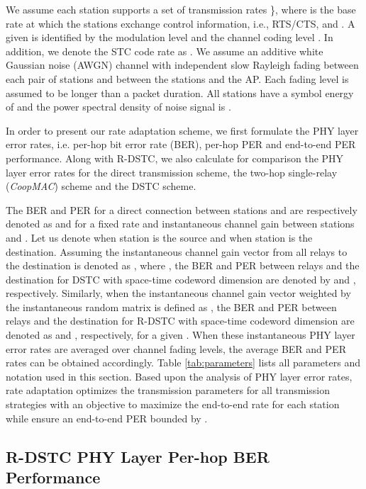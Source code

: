 \documentclass[peerreview,draftcls,onecolumn,12pt,a4paper]{IEEEtran}
\begin{document}
We assume each station supports a set of transmission rates \}, where  is the base rate at which
the stations exchange control information, i.e., RTS/CTS, and
. A given  is identified by the modulation
level  and the channel coding level . In addition, we
denote the STC code rate as . We assume an additive white
Gaussian noise (AWGN) channel with independent slow Rayleigh
fading between each pair of stations and between the stations and
the AP. Each fading level is assumed to be longer than a packet
duration. All stations have a symbol energy of  and the
power spectral density of noise signal is .

In order to present our rate adaptation scheme, we first formulate
the PHY layer error rates, i.e. per-hop bit error rate (BER),
per-hop PER and
end-to-end PER performance. Along with R-DSTC, we also calculate for comparison the PHY layer
error rates for the direct transmission scheme, the two-hop
single-relay ({\em CoopMAC}) scheme and the DSTC scheme.

The BER and PER for a direct connection between stations  and
 are respectively denoted as  and
 for a fixed rate  and instantaneous
channel gain  between stations  and . Let us denote
 when station  is the source and  when station  is
the destination. Assuming the instantaneous channel gain vector
from all relays to the destination is denoted as
, where , the BER and PER between relays and the destination for
DSTC with space-time codeword dimension  are denoted by
 and
, respectively.
Similarly, when the instantaneous channel gain vector
 weighted by the instantaneous random matrix
 is defined as , the BER and PER
between relays and the destination for R-DSTC with space-time
codeword dimension  are denoted as
 and
, respectively, for
a given . When these instantaneous PHY layer error rates are
averaged over channel fading levels, the average BER and PER rates
can be obtained accordingly. Table \ref{tab:parameters} lists all
parameters and notation used in this section. Based upon the
analysis of PHY layer error rates, rate adaptation optimizes the
transmission parameters for all transmission strategies with an
objective to maximize the end-to-end rate for each station while
ensure an end-to-end PER bounded by .

\vspace{-0.15in}
\subsection{R-DSTC PHY Layer Per-hop BER Performance} \label{sec:berperformance}
\vspace{-0.05in}
\end{document}

